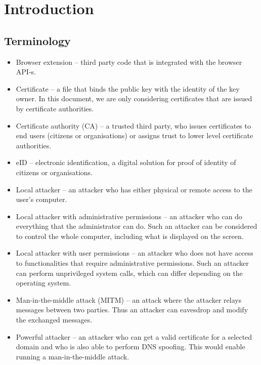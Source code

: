 \chapter{Introduction}

\section{Terminology}
\begin{itemize}

\item Browser extension -- third party code that is integrated with the browser API-s.

\item Certificate -- a file that binds the public key with the identity of the key owner. In this document, we are only considering certificates that are issued by certificate authorities.

\item Certificate authority (CA) -- a trusted third party, who issues certificates to end users (citizens or organisations) or assigns trust to lower level certificate authorities.

\item eID -- electronic identification, a digital solution for proof of identity of citizens or organisations.

\item Local attacker -- an attacker who has either physical or remote access to the user's computer.

\item Local attacker with administrative permissions -- an attacker who can do everything that the administrator can do. Such an attacker can be considered to control the whole computer, including what is displayed on the screen.

\item Local attacker with user permissions -- an attacker who does not have access to functionalities that require administrative permissions. Such an attacker can perform unprivileged system calls, which can differ depending on the operating system.

\item Man-in-the-middle attack (MITM) -- an attack where the attacker relays messages between two parties. Thus an attacker can eavesdrop and modify the exchanged messages.

\item Powerful attacker -- an attacker who can get a valid certificate for a selected domain and who is also able to perform DNS spoofing. This would enable running a man-in-the-middle attack.


\end{itemize}
